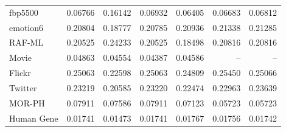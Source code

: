 \begin{longtable}{lrrrrrr}
fbp5500 & 0.06766 & 0.16142 & 0.06932 & 0.06405 & 0.06683 & 0.06812 \\
emotion6 & 0.20804 & 0.18777 & 0.20785 & 0.20936 & 0.21338 & 0.21285 \\
RAF-ML & 0.20525 & 0.24233 & 0.20525 & 0.18498 & 0.20816 & 0.20816 \\
Movie & 0.04863 & 0.04554 & 0.04387 & 0.04586 & -- & -- \\
Flickr & 0.25063 & 0.22598 & 0.25063 & 0.24809 & 0.25450 & 0.25066 \\
Twitter & 0.23219 & 0.20585 & 0.23220 & 0.22474 & 0.22963 & 0.23639 \\
MOR-PH & 0.07911 & 0.07586 & 0.07911 & 0.07123 & 0.05723 & 0.05723 \\
Human Gene & 0.01741 & 0.01473 & 0.01741 & 0.01767 & 0.01756 & 0.01742 \\
\bottomrule
\end{longtable}

